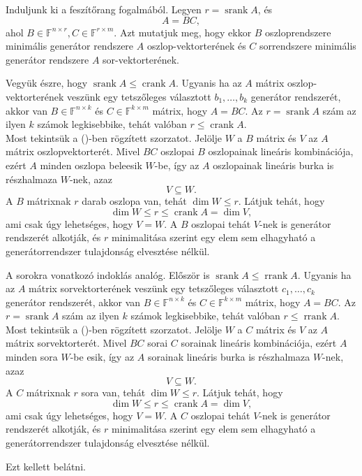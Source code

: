 \documentclass[9pt,showtrims]{memoir}
\makeatletter
\renewenvironment{proof}[1][\proofname]
    {\par\pushQED{\qed}%
    \normalfont \topsep6\p@\@plus6\p@\relax
    \trivlist
    \item[\hskip\labelsep
        \itshape
    #1\@addpunct{:}]\ignorespaces}
    {\popQED\endtrivlist\@endpefalse}
\theoremstyle{plain}
\theoremstyle{remark}
\theoremstyle{definition}
\renewcommand{\mathbf}{\mathbb}
\DeclareMathOperator{\crank}{crank}
\DeclareMathOperator{\rrank}{rrank}
\DeclareMathOperator{\srank}{srank}
\makeatother
\begin{document}
\begin{proof}
    Induljunk ki a feszítőrang fogalmából.
    Legyen $r=\srank{A}$, és 
    \[
        A=BC,\tag{\dag}
    \]
    ahol $B\in\mathbf{F}^{n\times r},C\in\mathbf{F}^{r\times m}$.
    Azt mutatjuk meg, hogy ekkor $B$ oszloprendszere minimális generátor rendszere $A$ oszlop-vektorterének
    és $C$ sorrendszere minimális generátor rendszere $A$ sor-vektorterének.

    Vegyük észre, hogy $\srank{A}\leq \crank{A}$.
    Ugyanis ha az $A$ mátrix oszlop-vektorterének veszünk egy tetszőleges választott
    $b_1,\dots,b_k$ generátor rendszerét, 
    akkor van $B\in\mathbf{F}^{n\times k}$ és $C\in\mathbf{F}^{k\times m}$ mátrix, hogy $A=BC$.
    Az $r=\srank{A}$ szám az ilyen $k$ számok legkisebbike, tehát valóban $r\leq\crank{A}$.
    \\
    Most tekintsük a (\dag)-ben rögzített szorzatot.
    Jelölje $W$ a $B$ mátrix és $V$ az $A$ mátrix oszlopvektorterét.
    Mivel $BC$ oszlopai $B$ oszlopainak lineáris kombinációja, 
    ezért $A$ minden oszlopa beleesik $W$-be, 
    így az $A$ oszlopainak lineáris burka is részhalmaza $W$-nek,
    azaz 
    \[
        V\subseteq W.
    \]
    A $B$ mátrixnak $r$ darab oszlopa van, 
    tehát $\dim W\leq r$.
    Látjuk tehát, hogy 
    \[\dim W\leq r\leq\crank{A}=\dim V,
    \]
    ami csak úgy lehetséges, 
    hogy $V=W$.
    A $B$ oszlopai tehát $V$-nek is generátor rendszerét alkotják,
    és $r$ minimalitása szerint egy elem sem elhagyható a generátorrendszer tulajdonság
    elvesztése nélkül.

    A sorokra vonatkozó indoklás analóg.
    Először is $\srank{A}\leq \rrank{A}$.
    Ugyanis ha az $A$ mátrix sorvektorterének veszünk egy tetszőleges választott
    $c_1,\dots,c_k$ generátor rendszerét, 
    akkor van $B\in\mathbf{F}^{n\times k}$ és $C\in\mathbf{F}^{k\times m}$ mátrix, hogy $A=BC$.
    Az $r=\srank{A}$ szám az ilyen $k$ számok legkisebbike, tehát valóban $r\leq\rrank{A}$.
    \\
    Most tekintsük a (\dag)-ben rögzített szorzatot.
    Jelölje $W$ a $C$ mátrix és $V$ az $A$ mátrix sorvektorterét.
    Mivel $BC$ sorai $C$ sorainak lineáris kombinációja, 
    ezért $A$ minden sora $W$-be esik,
    így az $A$ sorainak lineáris burka is részhalmaza $W$-nek,
    azaz 
    \[
        V\subseteq W.
    \]
    A $C$ mátrixnak $r$ sora van, 
    tehát $\dim W\leq r$.
    Látjuk tehát, hogy 
    \[\dim W\leq r\leq\crank{A}=\dim V,
    \]
    ami csak úgy lehetséges, 
    hogy $V=W$.
    A $C$ oszlopai tehát $V$-nek is generátor rendszerét alkotják,
    és $r$ minimalitása szerint egy elem sem elhagyható a generátorrendszer tulajdonság
    elvesztése nélkül.

    Ezt kellett belátni. 
\end{proof}
\end{document}
